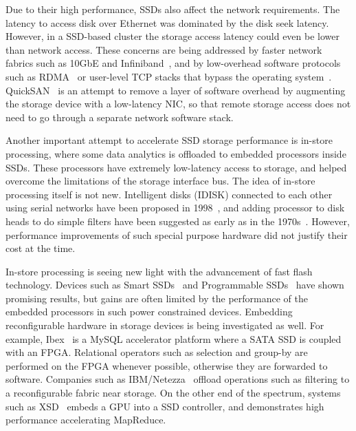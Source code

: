 Due to their high performance, SSDs also affect the network requirements.  The
latency to access disk over Ethernet was dominated by the disk seek latency.
However, in a SSD-based cluster the storage access latency could even be lower
than network access. These concerns are being addressed by faster network
fabrics such as 10GbE and Infiniband~\cite{infiniband}, and by low-overhead
software protocols such as RDMA~\cite{rdmampi, rdmahdfs, homrmapreduce, rdmahpc,
rdmampi, hadoopinfiniband} or user-level TCP stacks that bypass the operating
system~\cite{usertcp,userlevelprotocol}. QuickSAN~\cite{ucsd_quicksan} is an
attempt to remove a layer of software overhead by augmenting the storage device
with a low-latency NIC, so that remote storage access does not need to go
through a separate network software stack.

Another important attempt to accelerate SSD storage performance is in-store
processing, where some data analytics is offloaded to embedded processors inside
SSDs. These processors have extremely low-latency access to storage, and helped
overcome the limitations of the storage interface bus. The idea of in-store
processing itself is not new. Intelligent disks (IDISK) connected to
each other using serial networks have been proposed in 1998~\cite{idisk}, and
adding processor to disk heads to do simple filters have been suggested as early
as in the 1970s~\cite{searchprocessor,RAP,dbc}. However, performance improvements of such special
purpose hardware did not justify their cost at the time. 

In-store processing is seeing new light
with the advancement of fast flash technology. Devices such as Smart
SSDs~\cite{smartssdquery,smartssdcost,ucsd_willow} and Programmable
SSDs~\cite{xsd} have shown promising results, but gains are often limited by the performance of the embedded processors in such power constrained devices. 
Embedding reconfigurable hardware in storage devices is being
investigated as well. For example, Ibex~\cite{ibex} is a MySQL accelerator platform where a
SATA SSD is coupled with an FPGA. Relational operators such as selection and
group-by are performed on the FPGA whenever possible, otherwise they are
forwarded to software. Companies such as IBM/Netezza~\cite{netezza} offload operations such as filtering to a reconfigurable fabric near storage. On the other end of the spectrum, systems such as
XSD~\cite{xsd} embeds a GPU into a SSD controller, and demonstrates high
performance accelerating MapReduce.



